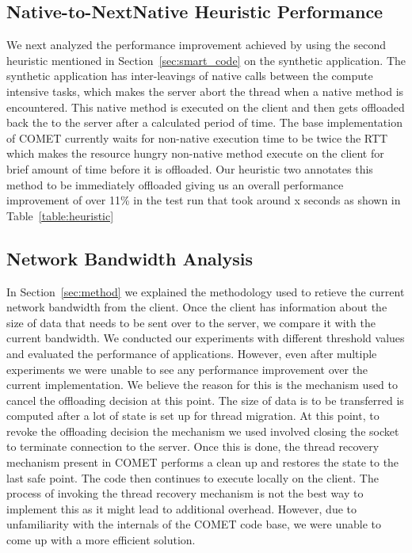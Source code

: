 \subsection{Native-to-NextNative Heuristic Performance}
We next analyzed the performance improvement achieved by using the second heuristic mentioned in Section~\ref{sec:smart_code} on the synthetic application. The synthetic application has inter-leavings of native calls between the compute intensive tasks, which makes the server abort the thread when a native method is encountered. This native method is executed on the client and then gets offloaded back the to the server after a calculated period of time. The base implementation of COMET currently waits for non-native execution time to be twice the RTT which makes the resource hungry non-native method execute on the client for brief amount of time before it is offloaded. Our heuristic two annotates this method to be immediately offloaded giving us an overall performance improvement of over 11\% in the test run that took around x seconds as shown in Table~\ref{table:heuristic}

\subsection{Network Bandwidth Analysis}
In Section~\ref{sec:method} we explained the methodology used to retieve the current network bandwidth from the client. Once the client has information
about the size of data that needs to be sent over to the server, we compare it with the current bandwidth. We conducted our experiments with
different threshold values and evaluated the performance of applications. However, even after multiple experiments we were unable to see any
performance improvement over the current implementation. We believe the reason for this is the mechanism used to cancel the offloading decision at this point.
The size of data is to be transferred is computed after a lot of state is set up for thread migration. At this point, to revoke the
offloading decision the mechanism we used involved closing the socket to terminate connection to the server. Once this is done, the thread recovery mechanism
present in COMET performs a clean up and restores the state to the last safe point. The code then continues to execute locally on the client. The process
of invoking the thread recovery mechanism is not the best way to implement this as it might lead to additional overhead. However, due to
unfamiliarity with the internals of the COMET code base, we were unable to come up with a more efficient solution.



